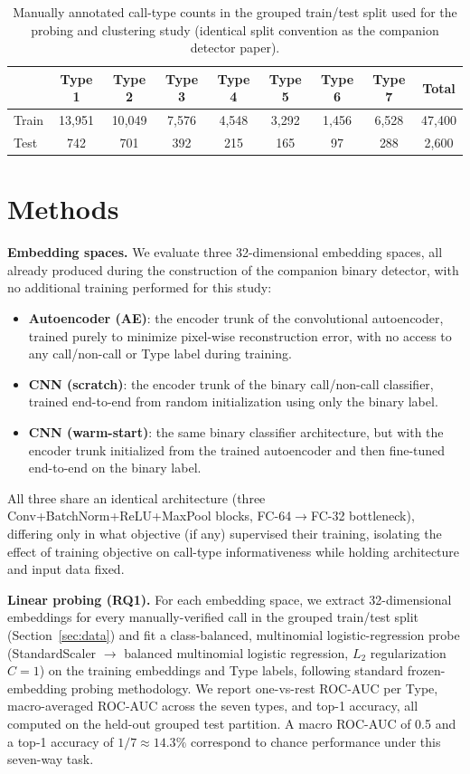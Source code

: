 \documentclass{article}
\begin{document}
\begin{table}[t]
  \centering
  \caption{Manually annotated call-type counts in the grouped train/test
  split used for the probing and clustering study (identical split
  convention as the companion detector paper).}
  \label{tab:counts}
  \begin{tabular}{lccccccc|c}
    \toprule
     & Type 1 & Type 2 & Type 3 & Type 4 & Type 5 & Type 6 & Type 7 & Total \\
    \midrule
    Train & 13{,}951 & 10{,}049 & 7{,}576 & 4{,}548 & 3{,}292 & 1{,}456 & 6{,}528 & 47{,}400 \\
    Test  &    742 &    701 &   392 &   215 &   165 &    97 &   288 &  2{,}600 \\
    \bottomrule
  \end{tabular}
\end{table}

\section{Methods}
\label{sec:methods}

\textbf{Embedding spaces.} We evaluate three 32-dimensional embedding
spaces, all already produced during the construction of the companion
binary detector, with no additional training performed for this study:
\begin{itemize}
  \item \textbf{Autoencoder (AE)}: the encoder trunk of the convolutional
  autoencoder, trained purely to minimize pixel-wise reconstruction error,
  with no access to any call/non-call or Type label during training.
  \item \textbf{CNN (scratch)}: the encoder trunk of the binary
  call/non-call classifier, trained end-to-end from random initialization
  using only the binary label.
  \item \textbf{CNN (warm-start)}: the same binary classifier architecture,
  but with the encoder trunk initialized from the trained autoencoder and
  then fine-tuned end-to-end on the binary label.
\end{itemize}
All three share an identical architecture (three Conv+BatchNorm+ReLU+MaxPool
blocks, FC-64$\to$FC-32 bottleneck), differing only in what objective (if
any) supervised their training, isolating the effect of training objective
on call-type informativeness while holding architecture and input data
fixed.

\textbf{Linear probing (RQ1).} For each embedding space, we extract
32-dimensional embeddings for every manually-verified call in the grouped
train/test split (Section~\ref{sec:data}) and fit a
class-balanced, multinomial logistic-regression probe (StandardScaler
$\to$ balanced multinomial logistic regression, $L_2$ regularization
$C=1$) on the training embeddings and Type labels, following standard
frozen-embedding probing methodology. We report one-vs-rest ROC-AUC
per Type, macro-averaged ROC-AUC across the seven types, and top-1
accuracy, all computed on the held-out grouped test partition. A
macro ROC-AUC of 0.5 and a top-1 accuracy of $1/7 \approx 14.3\%$
correspond to chance performance under this seven-way task.
\end{document}
